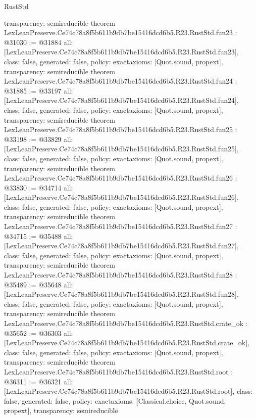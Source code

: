 \begin{lexlean}{RustStd}
\begin{coremodule}
{  transparency: semireducible
}
theorem LexLeanPreserve.Ce74c78a8f5b611b9db7be15416dcd6b5.R23.RustStd.fun23 : @31030 := @31884 {
  all: [LexLeanPreserve.Ce74c78a8f5b611b9db7be15416dcd6b5.R23.RustStd.fun23],
  class: false,
  generated: false,
  policy: exact{axioms: [Quot.sound, propext]},
  transparency: semireducible
}
theorem LexLeanPreserve.Ce74c78a8f5b611b9db7be15416dcd6b5.R23.RustStd.fun24 : @31885 := @33197 {
  all: [LexLeanPreserve.Ce74c78a8f5b611b9db7be15416dcd6b5.R23.RustStd.fun24],
  class: false,
  generated: false,
  policy: exact{axioms: [Quot.sound, propext]},
  transparency: semireducible
}
theorem LexLeanPreserve.Ce74c78a8f5b611b9db7be15416dcd6b5.R23.RustStd.fun25 : @33198 := @33829 {
  all: [LexLeanPreserve.Ce74c78a8f5b611b9db7be15416dcd6b5.R23.RustStd.fun25],
  class: false,
  generated: false,
  policy: exact{axioms: [Quot.sound, propext]},
  transparency: semireducible
}
theorem LexLeanPreserve.Ce74c78a8f5b611b9db7be15416dcd6b5.R23.RustStd.fun26 : @33830 := @34714 {
  all: [LexLeanPreserve.Ce74c78a8f5b611b9db7be15416dcd6b5.R23.RustStd.fun26],
  class: false,
  generated: false,
  policy: exact{axioms: [Quot.sound, propext]},
  transparency: semireducible
}
theorem LexLeanPreserve.Ce74c78a8f5b611b9db7be15416dcd6b5.R23.RustStd.fun27 : @34715 := @35488 {
  all: [LexLeanPreserve.Ce74c78a8f5b611b9db7be15416dcd6b5.R23.RustStd.fun27],
  class: false,
  generated: false,
  policy: exact{axioms: [Quot.sound, propext]},
  transparency: semireducible
}
theorem LexLeanPreserve.Ce74c78a8f5b611b9db7be15416dcd6b5.R23.RustStd.fun28 : @35489 := @35648 {
  all: [LexLeanPreserve.Ce74c78a8f5b611b9db7be15416dcd6b5.R23.RustStd.fun28],
  class: false,
  generated: false,
  policy: exact{axioms: [Quot.sound, propext]},
  transparency: semireducible
}
theorem LexLeanPreserve.Ce74c78a8f5b611b9db7be15416dcd6b5.R23.RustStd.crate_ok : @35652 := @36303 {
  all: [LexLeanPreserve.Ce74c78a8f5b611b9db7be15416dcd6b5.R23.RustStd.crate_ok],
  class: false,
  generated: false,
  policy: exact{axioms: [Quot.sound, propext]},
  transparency: semireducible
}
theorem LexLeanPreserve.Ce74c78a8f5b611b9db7be15416dcd6b5.R23.RustStd.root : @36311 := @36321 {
  all: [LexLeanPreserve.Ce74c78a8f5b611b9db7be15416dcd6b5.R23.RustStd.root],
  class: false,
  generated: false,
  policy: exact{axioms: [Classical.choice, Quot.sound, propext]},
  transparency: semireducible
}


\end{coremodule}
\end{lexlean}
